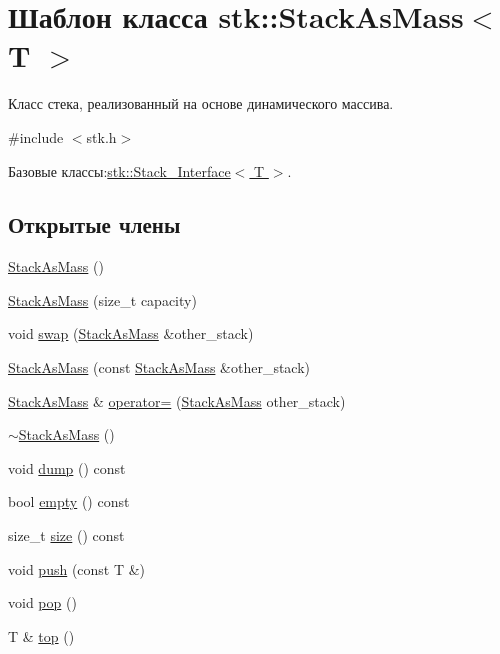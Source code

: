\hypertarget{classstk_1_1_stack_as_mass}{}\section{Шаблон класса stk\+:\+:Stack\+As\+Mass$<$ T $>$}
\label{classstk_1_1_stack_as_mass}


Класс стека, реализованный на основе динамического массива.  




{\ttfamily \#include $<$stk.\+h$>$}



Базовые классы\+:\hyperlink{classstk_1_1_stack___interface}{stk\+::\+Stack\+\_\+\+Interface$<$ T $>$}.

\subsection*{Открытые члены}
\begin{DoxyCompactItemize}
\item 
\hyperlink{classstk_1_1_stack_as_mass_aa5dca4927f4cf652cacd3741a45eb2ad}{Stack\+As\+Mass} ()
\item 
\hyperlink{classstk_1_1_stack_as_mass_a2b85fdd4e6f15092e1fa96bf35398985}{Stack\+As\+Mass} (size\+\_\+t capacity)
\item 
void \hyperlink{classstk_1_1_stack_as_mass_ab347dc6a6b317fb438d865ee854b9293}{swap} (\hyperlink{classstk_1_1_stack_as_mass}{Stack\+As\+Mass} \&other\+\_\+stack)
\item 
\hyperlink{classstk_1_1_stack_as_mass_ab5096a618f3822ca8ebc7c60a2218c24}{Stack\+As\+Mass} (const \hyperlink{classstk_1_1_stack_as_mass}{Stack\+As\+Mass} \&other\+\_\+stack)
\item 
\hyperlink{classstk_1_1_stack_as_mass}{Stack\+As\+Mass} \& \hyperlink{classstk_1_1_stack_as_mass_a3f5a454382082b41a6b57c4862491568}{operator=} (\hyperlink{classstk_1_1_stack_as_mass}{Stack\+As\+Mass} other\+\_\+stack)
\item 
\hyperlink{classstk_1_1_stack_as_mass_a83bdc71146620e82a676ae572a6756b6}{$\sim$\+Stack\+As\+Mass} ()
\item 
void \hyperlink{classstk_1_1_stack_as_mass_a4893c23d722d514f79a8e8fd10b9f0eb}{dump} () const 
\item 
bool \hyperlink{classstk_1_1_stack_as_mass_a0e8e793c3f09ebe95679a4a588f7973d}{empty} () const 
\item 
size\+\_\+t \hyperlink{classstk_1_1_stack_as_mass_a8859a0ecb70f45282bc9b5c8b9ade0fc}{size} () const 
\item 
void \hyperlink{classstk_1_1_stack_as_mass_a543d8f8b0b88bf906da28af2a39d61d5}{push} (const T \&)
\item 
void \hyperlink{classstk_1_1_stack_as_mass_a85fe3d75069a6304ab95e8715c5b3cb6}{pop} ()
\item 
T \& \hyperlink{classstk_1_1_stack_as_mass_a6b1b18b02db67e82ed6abbcfdc8ede1e}{top} ()
\end{DoxyCompactItemize}
